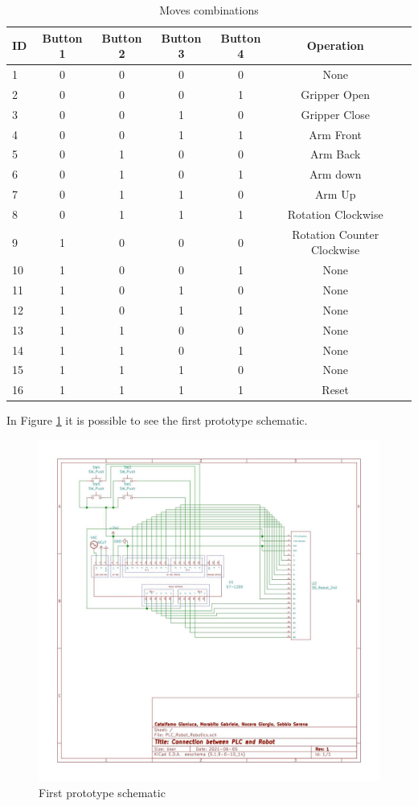 \begin{table}[!htp]\centering
\caption{Moves combinations}\label{tab:moves_combinations}
\scriptsize
{}
\begin{tabular}{lcccccc}\toprule
ID &Button 1 &Button 2 &Button 3 &Button 4 &Operation \\\midrule
1 &0 &0 &0 &0 &None \\
2 &0 &0 &0 &1 &Gripper Open \\
3 &0 &0 &1 &0 &Gripper Close \\
4 &0 &0 &1 &1 &Arm Front \\
5 &0 &1 &0 &0 &Arm Back \\
6 &0 &1 &0 &1 &Arm down \\
7 &0 &1 &1 &0 &Arm Up \\
8 &0 &1 &1 &1 &Rotation Clockwise \\
9 &1 &0 &0 &0 &Rotation Counter Clockwise \\
10 &1 &0 &0 &1 &None \\
11 &1 &0 &1 &0 &None \\
12 &1 &0 &1 &1 &None \\
13 &1 &1 &0 &0 &None \\
14 &1 &1 &0 &1 &None \\
15 &1 &1 &1 &0 &None \\
16 &1 &1 &1 &1 &Reset \\
\bottomrule
\end{tabular}
\end{table}

In Figure \ref{fig:fisrt_proto_schematic} it is possible to see the first prototype schematic.

\begin{figure}[!h]
\begin{center}
\includegraphics[width=1\linewidth]{capitolo3/figure/first_prototype.png}
\caption{First prototype schematic}
\label{fig:fisrt_proto_schematic}
\end{center}
\end{figure}

